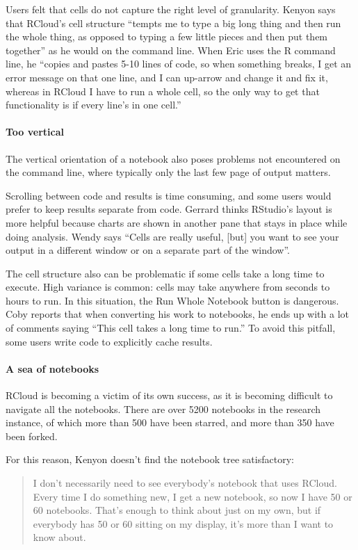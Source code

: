 Users felt that cells do not capture the right level of granularity.
Kenyon says that RCloud's cell structure
``tempts me to type a big long thing and then run the whole thing, as opposed to
typing a few little pieces and then put them together'' as he would on the command line.
When Eric uses the R command line, he ``copies and pastes 5-10 lines of code,
so when something breaks, I get an error message on that one line, and I can
up-arrow and change it and fix it, whereas in RCloud I have to run a whole cell,
so the only way to get that functionality is if every line's in one cell.''

\paragraph*{Too vertical} The vertical orientation of a notebook also poses problems
not encountered on the command line, where typically only the last few page of output matters.

Scrolling between code and results is time consuming, and some users would
prefer to keep results separate from code.
Gerrard thinks RStudio's layout is more helpful because charts
are shown in another pane that stays in place while doing analysis. Wendy says
``Cells are really useful, [but] you want to see your output in a different
window or on a separate part of the window''.

The cell structure also can be problematic if some cells take a long time to
execute. High variance is common: cells may take anywhere from seconds to
hours to run. In this situation, the Run Whole Notebook button is dangerous.
Coby reports that when converting his work to notebooks, he
ends up with a lot of comments saying ``This cell takes a long time to run.''
To avoid this pitfall, some users write code to explicitly cache results.

\paragraph*{A sea of notebooks} RCloud is becoming a victim of its own success, as it is becoming
difficult to navigate all the notebooks. There are over 5200 notebooks in
the research instance, of which more than 500 have been starred, and more
than 350 have been forked.

For this reason, Kenyon doesn't find the notebook tree satisfactory:
\begin{quote}
I don't necessarily need to see everybody's notebook that uses RCloud. Every
time I do something new, I get a new notebook, so now I have 50 or 60 notebooks.
That's enough to think about just on my own, but if everybody has
50 or 60 sitting on my display, it's more than I want to know about.
\end{quote}

